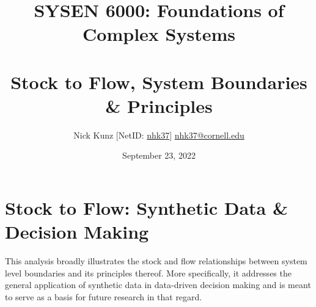 \documentclass{article}
\begin{document}
\title{SYSEN 6000: Foundations of Complex Systems\\~\\
    \Large Stock to Flow, System Boundaries \& Principles
}
\author{
    Nick Kunz [NetID: \url{nhk37}] \hyperlink{nhk37@cornell.edu}{nhk37@cornell.edu}}
\date{September 23, 2022}
\maketitle
\thispagestyle{fancy}

\section*{Stock to Flow: Synthetic Data \& Decision Making}

This analysis broadly illustrates the stock and flow relationships between system level boundaries and its principles thereof. More specifically, it addresses the general application of synthetic data in data-driven decision making and is meant to serve as a basis for future research in that regard.


\\~\\
\end{document}
